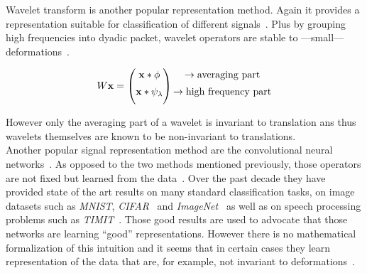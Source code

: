 \documentclass[a4paper,11pt]{report}
\begin{document}
			Wavelet transform is another popular representation method. Again it provides a representation suitable for classification of different signals~\citep{de2000using}. Plus by grouping high frequencies into dyadic packet, wavelet operators are stable to ---small--- deformations~\citep{bruna2013invariant}.  %
			
			\begin{equation}
				\begin{matrix}
					W{\bf x} =
					\begin{pmatrix}
						{\bf x} \ast \phi \\[0.5em]
						{\bf x} \ast \psi_{\lambda} \\[0.5em]
					\end{pmatrix}
					\begin{aligned}
						\begin{matrix}
							\rightarrow \text{averaging part}				\\[0.5em]
							\rightarrow \text{high frequency part}	\\[0.5em]
						\end{matrix}
					\end{aligned}
				\end{matrix}
			\end{equation}
		
			However only the averaging part of a wavelet is invariant to translation ans thus wavelets themselves are known to be non-invariant to translations.\\
			
			Another popular signal representation method are the convolutional neural networks~\citep{lecun1995convolutional}. As opposed to the two methods mentioned previously, those operators are not fixed but learned from the data~\citep{simard2003best}. Over the past decade they have provided state of the art results on many standard classification tasks, on image datasets such as \textit{MNIST}, \textit{CIFAR}~\citep{hinton2012improving} and \textit{ImageNet}~\citep{krizhevsky2012imagenet} as well as on speech processing problems such as \textit{TIMIT}~\citep{abdel2012applying}. Those good results are used to advocate that those networks are learning ``good'' representations. However there is no mathematical formalization of this intuition and it seems that in certain cases they learn representation of the data that are, for example, not invariant to deformations~\citep{szegedy2013intriguing}.\\
			
\end{document}
